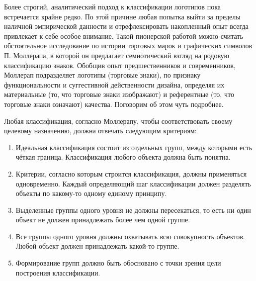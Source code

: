 Более строгий, аналитический подход к классификации логотипов пока встречается крайне редко. По этой
причине любая попытка выйти за пределы наличной эмпирической данности и отрефлексировать накопленный
опыт всегда привлекает к себе особое внимание. Такой пионерской работой можно считать обстоятельное
исследование по истории торговых марок и графических символов П. Моллерапа, в которой он предлагает
семиотический взгляд на родовую классификацию знаков. Обобщив опыт предшественников и современников,
Моллерап подразделяет логотипы (торговые знаки), по признаку функциональности и суггестивной
действенности дизайна, определяя их материальные (то, что торговые знаки изображают) и референтные
(то, что торговые знаки означают) качества. Поговорим об этом чуть подробнее.

Любая классификация, согласно Моллерапу\autocite[][98]{mollerup1999marks}, чтобы соответствовать
своему целевому назначению, должна отвечать следующим критериям:
\begin{enumerate}
\item Идеальная классификация состоит из отдельных групп, между которыми есть чёткая
  граница. Классификация любого объекта должна быть понятна.
\item Критерии, согласно которым строится классификация, должны применяться одновременно. Каждый
  определяющий шаг классификации должен разделять объекты по какому-то одному единому принципу.
\item Выделенные группы одного уровня не должны пересекаться, то есть ни один объект не должен
  принадлежать более чем одной группе.
\item Все группы одного уровня должны охватывать всю совокупность объектов. Любой объект должен
  принадлежать какой-то группе.
\item Формирование групп должно быть обосновано с точки зрения цели построения классификации.
\end{enumerate}

